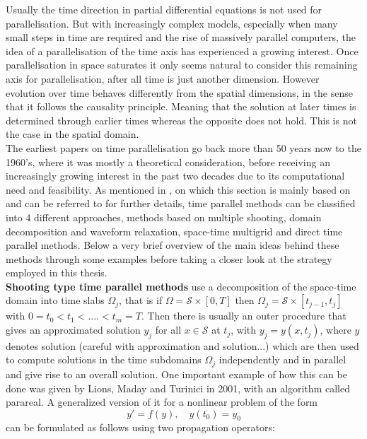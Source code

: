 \documentclass[fleqn, a4paper, 11pt, bibliography=totoc]{report}
\begin{document}
Usually the time direction in partial differential equations is not used for parallelisation. But with increasingly complex models, especially when many small steps in time are required and the rise of massively parallel computers, the idea of a parallelisation of the time axis has experienced a growing interest. Once parallelisation in space saturates it only seems natural to consider this remaining axis for parallelisation, after all time is just another dimension. However evolution over time behaves differently from the spatial dimensions, in the sense that it follows the causality principle. Meaning that the solution at later times is determined through earlier times whereas the opposite does not hold. This is not the case in the spatial domain. 
\smallskip
\\ 
The earliest papers on time parallelisation go back more than 50 years now to the 1960's, where it was mostly a theoretical consideration, before receiving an increasingly growing interest in the past two decades due to its computational need and feasibility. As mentioned in \cite{gander201550}, on which this section is mainly based on and can be referred to for further details, time parallel methods can be classified into 4 different approaches, methods based on multiple shooting, domain decomposition and waveform relaxation, space-time multigrid and direct time parallel methods. Below a very brief overview of the main ideas behind these methods through some examples before taking a closer look at the strategy employed in this thesis. 
\smallskip
\\
\textbf{Shooting type time parallel methods} use a decomposition of the space-time domain into time slabs $\Omega_j$, that is if $\Omega = \mathcal{S} \times [0, T]$ then $ \Omega_j =  \mathcal{S} \times [t_{j-1}, t_j]$ with $0 = t_0 < t_1 < .... < t_m = T$. Then there is usually an outer procedure that gives an approximated solution $y_j$ for all $ x \in \mathcal{S}$ at $t_j$, with $y_j = y(x, t_j)$, where $y$ denotes solution (careful with approximation and solution...) which are then used to compute solutions in the time subdomains $\Omega_j$ independently and in parallel and give rise to an overall solution. One important example of how this can be done was given by Lions, Maday and Turinici in 2001, with an algorithm called parareal. A generalized version of it for a nonlinear problem of the form
\begin{equation*}
y' = f(y), \quad y(t_0) = y_0
\end{equation*}
can be formulated as follows using two propagation operators:
\end{document}
